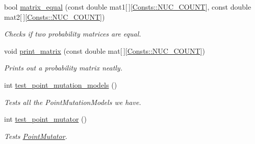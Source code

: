 \begin{DoxyCompactItemize}
bool \hyperlink{namespaceretrocombinator_a0e4387f4392819cd377c71d5771b39b1}{matrix\+\_\+equal} (const double mat1\mbox{[}$\,$\mbox{]}\mbox{[}\hyperlink{namespaceretrocombinator_1_1Consts_a274e9195aeee16a2bc05c6c2d13da17da4267c64ef80aa3023d8e808832e04b4e}{Consts\+::\+N\+U\+C\+\_\+\+C\+O\+U\+NT}\mbox{]}, const double mat2\mbox{[}$\,$\mbox{]}\mbox{[}\hyperlink{namespaceretrocombinator_1_1Consts_a274e9195aeee16a2bc05c6c2d13da17da4267c64ef80aa3023d8e808832e04b4e}{Consts\+::\+N\+U\+C\+\_\+\+C\+O\+U\+NT}\mbox{]})
\begin{DoxyCompactList}\small\item\em Checks if two probability matrices are equal. \end{DoxyCompactList}\item 
\mbox{\label{namespaceretrocombinator_a90c507fa82509405f5f2a8c4dc7c259b}} 
void \hyperlink{namespaceretrocombinator_a90c507fa82509405f5f2a8c4dc7c259b}{print\+\_\+matrix} (const double mat\mbox{[}$\,$\mbox{]}\mbox{[}\hyperlink{namespaceretrocombinator_1_1Consts_a274e9195aeee16a2bc05c6c2d13da17da4267c64ef80aa3023d8e808832e04b4e}{Consts\+::\+N\+U\+C\+\_\+\+C\+O\+U\+NT}\mbox{]})
\begin{DoxyCompactList}\small\item\em Prints out a probability matrix neatly. \end{DoxyCompactList}\item 
\mbox{\label{namespaceretrocombinator_a0ace3feeda4945831fff48a117b38ab5}} 
int \hyperlink{namespaceretrocombinator_a0ace3feeda4945831fff48a117b38ab5}{test\+\_\+point\+\_\+mutation\+\_\+models} ()
\begin{DoxyCompactList}\small\item\em Tests all the Point\+Mutation\+Models we have. \end{DoxyCompactList}\item 
\mbox{\label{namespaceretrocombinator_a3f99050424a8b7cf5dcb7978dc09a9dd}} 
int \hyperlink{namespaceretrocombinator_a3f99050424a8b7cf5dcb7978dc09a9dd}{test\+\_\+point\+\_\+mutator} ()
\begin{DoxyCompactList}\small\item\em Tests \hyperlink{classretrocombinator_1_1PointMutator}{Point\+Mutator}. \end{DoxyCompactList}\item 
\mbox{\label{namespaceretrocombinator_a15194234ee9ebb9f3901e14cf7b77450}} 

\end{DoxyCompactItemize}
